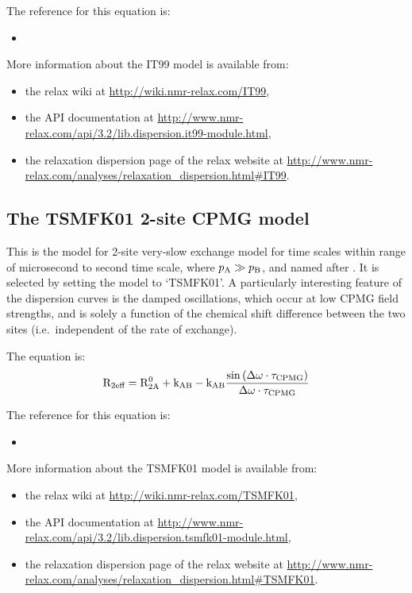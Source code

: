 The reference for this equation is:
\begin{itemize}
  \item {}
\end{itemize}

More information about the IT99 model is available from:
\begin{itemize}
  \item the relax wiki at \url{http://wiki.nmr-relax.com/IT99},
  \item the API documentation at \url{http://www.nmr-relax.com/api/3.2/lib.dispersion.it99-module.html},
  \item the relaxation dispersion page of the relax website at \url{http://www.nmr-relax.com/analyses/relaxation\_dispersion.html#IT99}.
\end{itemize}



\subsection{The TSMFK01 2-site CPMG model}
\label{sect: dispersion: TSMFK01 model}

This is the model for 2-site very-slow exchange model for time scales within range of microsecond to second time scale, where $p_{\textrm{A}} \gg p_{\textrm{B}}$, and named after \citet{Tollinger01}.
It is selected by setting the model to `TSMFK01'.
A particularly interesting feature of the dispersion curves is the damped oscillations, which occur at low CPMG field strengths, and is solely a function of the chemical shift difference between the two sites (i.e.\ independent of the rate of exchange).

The equation is:
\begin{equation}
    \mathrm{R}_{\textrm{2eff}} = \mathrm{R}_{\mathrm{2A}}^0 + \textrm{k}_{\textrm{AB}} - \textrm{k}_{\textrm{AB}} \frac{\sin{(\Delta\omega\cdot \tau_{\textrm{CPMG}})}}{\Delta\omega \cdot \tau_{\textrm{CPMG}}}
\end{equation}

The reference for this equation is:
\begin{itemize}
  \item {}
\end{itemize}

More information about the TSMFK01 model is available from:
\begin{itemize}
  \item the relax wiki at \url{http://wiki.nmr-relax.com/TSMFK01},
  \item the API documentation at \url{http://www.nmr-relax.com/api/3.2/lib.dispersion.tsmfk01-module.html},
  \item the relaxation dispersion page of the relax website at \url{http://www.nmr-relax.com/analyses/relaxation\_dispersion.html#TSMFK01}.
\end{itemize}


